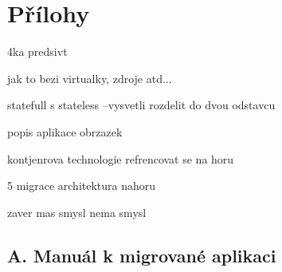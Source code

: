 \chapter{Přílohy}
\setcounter{page}{1}




4ka predsivt

jak to bezi virtualky, zdroje atd...

statefull s
stateless
--vysvetli rozdelit  do dvou odstavcu

popis aplikace obrzazek

kontjenrova technologie
refrencovat se na horu


5 migrace
architektura nahoru


zaver 
mas smysl nema smysl
\section{A. Manuál k migrované aplikaci}






